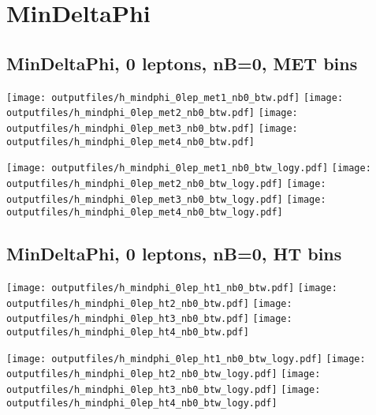 \documentclass[11pt]{article}
\begin{document}
    \section{ MinDeltaPhi }

    \subsection{ MinDeltaPhi, 0 leptons, nB=0, MET bins }

    \noindent
     \texttt{[image: outputfiles/h\_mindphi\_0lep\_met1\_nb0\_btw.pdf]}
     \texttt{[image: outputfiles/h\_mindphi\_0lep\_met2\_nb0\_btw.pdf]}
     \texttt{[image: outputfiles/h\_mindphi\_0lep\_met3\_nb0\_btw.pdf]}
     \texttt{[image: outputfiles/h\_mindphi\_0lep\_met4\_nb0\_btw.pdf]}

    \noindent
     \texttt{[image: outputfiles/h\_mindphi\_0lep\_met1\_nb0\_btw\_logy.pdf]}
     \texttt{[image: outputfiles/h\_mindphi\_0lep\_met2\_nb0\_btw\_logy.pdf]}
     \texttt{[image: outputfiles/h\_mindphi\_0lep\_met3\_nb0\_btw\_logy.pdf]}
     \texttt{[image: outputfiles/h\_mindphi\_0lep\_met4\_nb0\_btw\_logy.pdf]}

    \clearpage



    \subsection{ MinDeltaPhi, 0 leptons, nB=0, HT bins }

    \noindent
     \texttt{[image: outputfiles/h\_mindphi\_0lep\_ht1\_nb0\_btw.pdf]}
     \texttt{[image: outputfiles/h\_mindphi\_0lep\_ht2\_nb0\_btw.pdf]}
     \texttt{[image: outputfiles/h\_mindphi\_0lep\_ht3\_nb0\_btw.pdf]}
     \texttt{[image: outputfiles/h\_mindphi\_0lep\_ht4\_nb0\_btw.pdf]}

    \noindent
     \texttt{[image: outputfiles/h\_mindphi\_0lep\_ht1\_nb0\_btw\_logy.pdf]}
     \texttt{[image: outputfiles/h\_mindphi\_0lep\_ht2\_nb0\_btw\_logy.pdf]}
     \texttt{[image: outputfiles/h\_mindphi\_0lep\_ht3\_nb0\_btw\_logy.pdf]}
     \texttt{[image: outputfiles/h\_mindphi\_0lep\_ht4\_nb0\_btw\_logy.pdf]}
\end{document}
